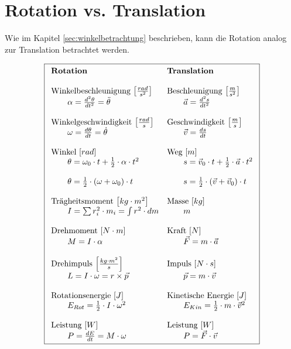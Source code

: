 \newpage
\section{Rotation vs. Translation}
Wie im Kapitel \ref{sec:winkelbetrachtung} beschrieben, kann die 
Rotation analog zur Translation betrachtet werden.

\[ \boxed{\begin{array}{l l}
\textbf{Rotation} & \textbf{Translation} \\
& \\
\text{Winkelbeschleunigung $\left[\frac{rad}{s^2}\right]$}
	& \text{Beschleunigung $\left[\frac{m}{s^2}\right]$} \\
		\qquad \alpha = \frac{d^2\theta}{dt^2} = \ddot{\theta}
			& \qquad \vec{a} = \frac{d^2s}{dt^2} \\
& \\
\text{Winkelgeschwindigkeit $\left[\frac{rad}{s}\right]$} 
	& \text{Geschwindigkeit $\left[\frac{m}{s}\right]$} \\
		\qquad \omega = \frac{d\theta}{dt} = \dot{\theta} 
			& \qquad \vec{v} = \frac{ds}{dt} \\
& \\
\text{Winkel $\left[rad\right]$} 
	& \text{Weg $\left[ m \right]$} \\
		\qquad \theta = \omega_0 \cdot t + \frac{1}{2} \cdot \alpha \cdot t^2
			& \qquad s = \vec{v}_0 \cdot t + \frac{1}{2} \cdot \vec{a} \cdot t^2 \\
		& \\
		\qquad \theta = \frac{1}{2} \cdot (\omega + \omega_0) \cdot t
			& \qquad s = \frac{1}{2} \cdot (\vec{v} + \vec{v}_0) \cdot t \\
& \\
\text{Trägheitsmoment $\left[kg \cdot m^2\right]$} 
	& \text{Masse $\left[kg\right]$} \\
		\qquad I = \sum r_i^2 \cdot m_i = \int r^2 \cdot dm
			& \qquad m \\
& \\
\text{Drehmoment $\left[N \cdot m\right]$}
	& \text{Kraft $\left[N\right]$} \\
		\qquad M = I \cdot \alpha
			& \qquad \vec{F} = m \cdot \vec{a} \\
& \\
\text{Drehimpuls $\left[\frac{kg \cdot m^2}{s}\right]$} 
	& \text{Impuls $\left[N \cdot s\right]$} \\
		\qquad L = I \cdot \omega 
			= r \times \vec{p}
			& \qquad \vec{p} = m \cdot \vec{v} \\
& \\
\text{Rotationsenergie $\left[J\right]$} 
	& \text{Kinetische Energie $\left[J\right]$} \\
		\qquad E_{Rot} = \frac{1}{2} \cdot I \cdot \omega^2
			& \qquad E_{Kin} = \frac{1}{2} \cdot m \cdot \vec{v}^2 \\
& \\
\text{Leistung $\left[W\right]$}
	& \text{Leistung $\left[W\right]$} \\
		\qquad P = \frac{dE}{dt} = M \cdot \omega 
			& \qquad P = \vec{F} \cdot \vec{v}
\end{array} } \]


